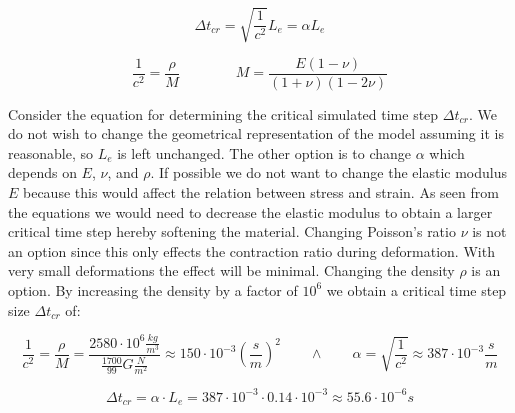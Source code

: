 \begin{equation*}
\Delta t_{cr} = \sqrt{\frac{1}{c^2}} L_e = \alpha L_e
\end{equation*}

\begin{equation*}
\frac{1}{c^2} = \frac{\rho}{M}
\qquad \qquad
M = \frac{E(1-\nu)}{(1+\nu)(1-2\nu)}
\end{equation*}


Consider the equation for determining the critical simulated time step
$\Delta t_{cr}$. We do not wish to change the geometrical representation
of the model assuming it is reasonable, so $L_e$ is left
unchanged. The other option is to change $\alpha$ which depends on
$E$, $\nu$, and $\rho$.  If possible we do not want to 
change the elastic modulus $E$ because this would affect the relation
between stress and strain. As seen from the equations we would need to
decrease the elastic modulus to obtain a larger critical time step
hereby softening the material. Changing Poisson's ratio $\nu$ is not an
option since this only effects the contraction ratio during
deformation. With very small deformations the effect will be
minimal. Changing the density $\rho$ is an option.  
%
By increasing the density by a factor of $10^6$ we obtain a critical
time step size $\Delta t_{cr}$ of: 


\begin{equation}
\frac{1}{c^2} = \frac{\rho}{M}
= \frac{2580 \cdot 10^6 \frac{kg}{m^3}}{\frac{1700}{99} G \frac{N}{m^2}}
\approx 150 \cdot 10^{-3} (\frac{s}{m})^2
\qquad \wedge \qquad
\alpha = \sqrt{\frac{1}{c^2}}
\approx 387 \cdot 10^{-3} \frac{s}{m}
\end{equation}

\begin{equation}
\Delta t_{cr} = \alpha \cdot L_e
= 387 \cdot 10^{-3} \cdot 0.14 \cdot 10^{-3}
\approx 55.6 \cdot 10^{-6}s
\end{equation}

